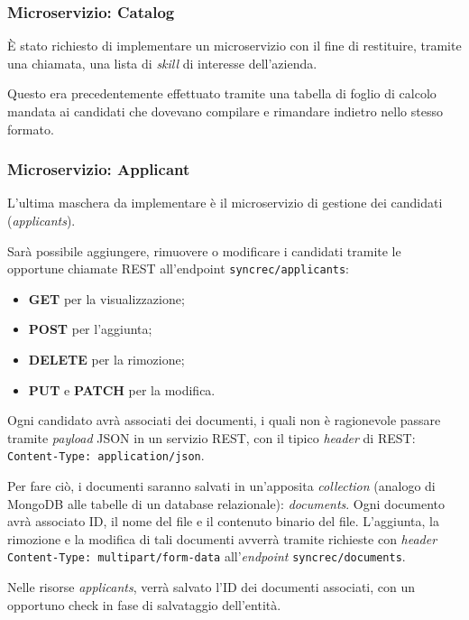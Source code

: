 \subsubsection{Microservizio: Catalog}

È stato richiesto di implementare un microservizio con il fine di restituire,
tramite una chiamata, una lista di \textit{skill} di interesse dell'azienda.

Questo era precedentemente effettuato tramite una tabella di foglio di calcolo mandata ai candidati che dovevano compilare e rimandare indietro nello stesso formato.

\subsubsection{Microservizio: Applicant}

L'ultima maschera da implementare è il microservizio di gestione dei candidati (\textit{applicants}).

Sarà possibile aggiungere, rimuovere o modificare i candidati tramite
le opportune chiamate REST all'endpoint \texttt{syncrec/applicants}:
\begin{itemize}
	\item \textbf{GET} per la visualizzazione;
	\item \textbf{POST} per l'aggiunta;
	\item \textbf{DELETE} per la rimozione;
	\item \textbf{PUT} e \textbf{PATCH} per la modifica.
\end{itemize}

Ogni candidato avrà associati dei documenti, i quali non è ragionevole passare tramite \textit{payload} JSON in un servizio REST, con il tipico \textit{header} di REST: \texttt{Content-Type: application/json}.

Per fare ciò, i documenti saranno salvati in un'apposita \textit{collection} (analogo di MongoDB alle tabelle di un database relazionale):
\textit{documents}.
Ogni documento avrà associato ID, il nome del file e il contenuto binario del file.
L'aggiunta, la rimozione e la modifica di tali documenti avverrà tramite richieste con \textit{header} \texttt{Content-Type: multipart/form-data}
all'\textit{endpoint} \texttt{syncrec/documents}.

Nelle risorse \textit{applicants}, verrà salvato l'ID dei documenti associati, con un opportuno check in fase di salvataggio dell'entità.



